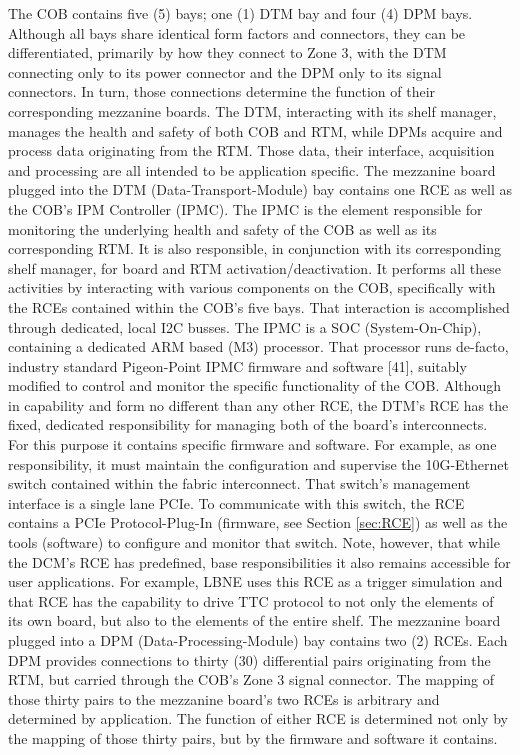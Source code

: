 The COB contains five (5) bays; one (1) DTM bay and four (4) DPM bays. Although all bays share identical form factors and connectors, they can be differentiated, primarily by how they connect to Zone 3, with the DTM connecting only to its power connector and the DPM only to its signal connectors. In turn, those connections determine the function of their corresponding mezzanine boards. The DTM, interacting with its shelf manager, manages the health and safety of both COB and RTM, while DPMs acquire and process data originating from the RTM. Those data, their interface, acquisition and processing are all intended to be application specific.
The mezzanine board plugged into the DTM (Data-Transport-Module) bay contains one RCE as well as the COB's IPM Controller (IPMC). The IPMC is the element responsible for monitoring the underlying health and safety of the COB as well as its corresponding RTM. It is also responsible, in conjunction with its corresponding shelf manager, for board and RTM activation/deactivation. It performs all these activities by interacting with various components on the COB, specifically with the RCEs contained within the COB's five bays. That interaction is accomplished through dedicated, local I2C busses. The IPMC is a SOC (System-On-Chip), containing a dedicated ARM based (M3) processor. That processor runs de-facto, industry standard Pigeon-Point IPMC firmware and software [41], suitably modified to control and monitor the specific functionality of the COB.
Although in capability and form no different than any other RCE, the DTM's RCE has the fixed, dedicated responsibility for managing both of the board's interconnects. For this purpose it contains specific firmware and software. For example, as one responsibility, it must maintain the configuration and supervise the 10G-Ethernet switch contained within the fabric interconnect. That switch's management interface is a single lane PCIe. To communicate with this switch, the RCE contains a PCIe Protocol-Plug-In (firmware, see Section \ref{sec:RCE}) as well as the tools (software) to configure and monitor that switch. Note, however, that while the DCM's RCE has predefined, base responsibilities it also remains accessible for user applications. For example, LBNE uses this RCE as a trigger simulation and that RCE has the capability to drive TTC protocol to not only the elements of its own board, but also to the elements of the entire shelf.
The mezzanine board plugged into a DPM (Data-Processing-Module) bay contains two (2) RCEs. Each DPM provides connections to thirty (30) differential pairs originating from the RTM, but carried through the COB's Zone 3 signal connector. The mapping of those thirty pairs to the mezzanine board's two RCEs is arbitrary and determined by application. The function of either RCE is determined not only by the mapping of those thirty pairs, but by the firmware and software it contains.
